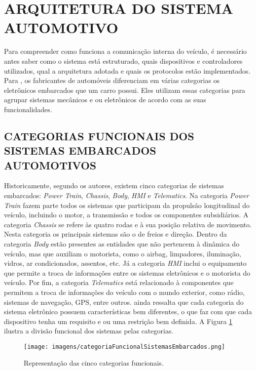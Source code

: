 \section{ARQUITETURA DO SISTEMA AUTOMOTIVO}
Para compreender como funciona a comunicação interna do veículo, é necessário antes saber como o sistema está estruturado, quais dispositivos e controladores utilizados, qual a arquitetura adotada e quais os protocolos estão implementados. Para , os fabricantes de automóveis diferenciam em várias categorias os eletrônicos embarcados que um carro possui. Eles utilizam essas categorias para agrupar sistemas mecânicos e ou eletrônicos de acordo com as suas funcionalidades.

\subsection{CATEGORIAS FUNCIONAIS DOS SISTEMAS EMBARCADOS AUTOMOTIVOS}
Historicamente, segundo os autores, existem cinco categorias de sistemas embarcados: \textit{Power Train}, \textit{Chassis}, \textit{Body}, \textit{HMI} e \textit{Telematics}. Na categoria \textit{Power Train} fazem parte todos os sistemas que participam da propulsão longitudinal do veículo, incluindo o motor, a transmissão e todos os componentes subsidiários. A categoria \textit{Chassis} se refere às quatro rodas e à sua posição relativa de movimento. Nesta categoria os principais sistemas são o de freios e direção. Dentro da categoria \textit{Body} estão presentes as entidades que não pertencem à dinâmica do veículo, mas que auxiliam o motorista, como o airbag, limpadores, iluminação, vidros, ar condicionados, assentos, etc. Já a categoria \textit{HMI} inclui o equipamento que permite a troca de informações entre os sistemas eletrônicos e o motorista do veículo. Por fim, a categoria \textit{Telematics} está relacionado à componentes que permitem a troca de informações do veículo com o mundo exterior, como rádio, sistemas de navegação, GPS, entre outros.  ainda ressalta que cada categoria do sistema eletrônico possuem características bem diferentes, o que faz com que cada dispositivo tenha um requisito e ou uma restrição bem definida. A Figura \ref{Fig:categorias_sistemas_embarcados} ilustra a divisão funcional dos sistemas pelas categorias.

\begin{figure}[!ht]
\centering
\caption{Representação das cinco categorias funcionais.} 
{\texttt{[image: imagens/categoriaFuncionalSistemasEmbarcados.png]}}\\
 \label{Fig:categorias_sistemas_embarcados}
\end{figure}


